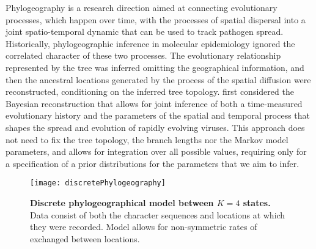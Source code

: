Phylogeography is a research direction aimed at connecting evolutionary processes, which happen over time, with the processes of spatial dispersal into a joint spatio-temporal dynamic that can be used to track pathogen spread.
Historically, phylogeographic inference in molecular epidemiology ignored the correlated character of these two processes. 
The evolutionary relationship represented by the tree was inferred omitting the geographical information, and then the ancestral locations generated by the process of the spatial diffusion were reconstructed, conditioning on the inferred tree topology.
\citet{Lemey2009} first considered the Bayesian reconstruction that allows for joint inference of both a time-measured evolutionary history and the parameters of the spatial and temporal process that shapes the spread and evolution of 
rapidly evolving viruses.
This approach does not need to fix the tree topology, the branch lengths nor the Markov model parameters, and allows for integration over all possible values, requiring only for a specification of a prior distributions for the parameters that we aim to infer.


\begin{figure}[h!]
\centering
\texttt{[image: discretePhylogeography]} 
\caption{
{ \footnotesize 
{\bf Discrete phylogeographical model between $K=4$ states.} 
Data consist of both the character sequences and locations at which they were recorded.
Model allows for non-symmetric rates of exchanged between locations.
}%
}
\label{fig:discrete_phylo_illust}
\end{figure}



